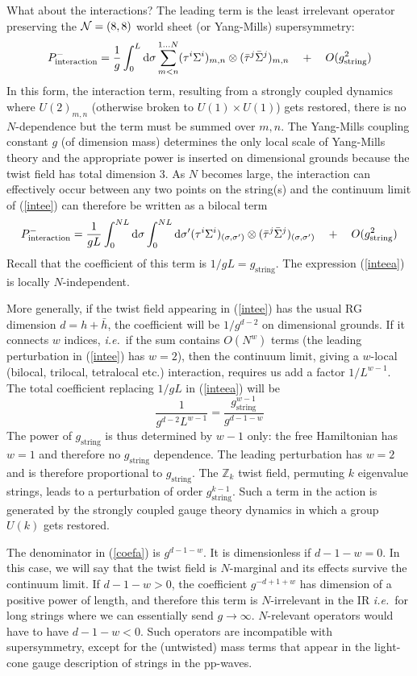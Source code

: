 \documentclass[nohyper,12pt,letterpaper]{JHEP3}
\def\IZ{{\mathbb Z}}           %
\def \eqref#1{(\ref{#1})}
\def \eqn#1#2{\begin{equation}#2\label{#1}\end{equation}}
\def \gs{g_{\mathrm{string}}}
\def \inte{{\mathrm{interaction}}}
\begin{document}
What about the interactions? The leading term is the least irrelevant
operator preserving the ${\cal N}=(8,8)$ world sheet (or Yang-Mills)
supersymmetry:
%
\eqn{intee}{P^-_\inte = 
\frac{1}{g}
\int_0^L {\rm d}\sigma
\sum_{m<n}^{1\dots N}
(\tau^i\Sigma^i)_{m,n}\otimes (\bar \tau^j\bar\Sigma^j)_{m,n}
\quad + \quad
O(\gs^2)} 
%
In this form, the interaction term, resulting from a
strongly coupled dynamics where $U(2)_{m,n}$ (otherwise broken to
$U(1)\times U(1)$) gets restored, there is no $N$-dependence but the
term must be summed over $m,n$. The Yang-Mills coupling constant $g$
(of dimension mass) determines the only local scale of Yang-Mills
theory and the appropriate power is inserted on dimensional grounds
because the twist field has total dimension $3$.  As $N$ becomes
large, the interaction can effectively occur between any two points on
the string(s) and the continuum limit of \eqref{intee} can therefore
be written as a bilocal term
%
\eqn{inteea}{P^-_\inte = \frac{1}{gL}
\int_0^{NL} {\rm d}\sigma
\int_0^{NL} {\rm d}\sigma'
(\tau^i\Sigma^i)_{(\sigma,\sigma')}\otimes (\bar \tau^j\bar\Sigma^j)_{
(\sigma,\sigma')}\quad + \quad
O(\gs^2)}
%
Recall that the coefficient of this term is $1/gL=\gs$. The expression 
\eqref{inteea} is locally $N$-independent.

More generally, if the twist field appearing in \eqref{intee} has 
the usual RG 
dimension $d=h+\bar h$, the coefficient will be $1/g^{d-2}$ on dimensional 
grounds. If it connects $w$ indices, {\it  i.e.}\ if the sum contains 
$O(N^w)$ terms (the leading perturbation in \eqref{intee} has $w=2$), then 
the continuum limit, giving a $w$-local (bilocal, trilocal, tetralocal 
etc.) interaction,
requires us add a factor $1/L^{w-1}$. The total 
coefficient replacing $1/gL$ in \eqref{inteea} will be
\eqn{coefa}{\frac{1}{g^{d-2}L^{w-1}}=\frac{\gs^{w-1}}{g^{d-1-w}}}
The power of $\gs$ is thus determined by $w-1$ only: the free Hamiltonian 
has $w=1$ and therefore no $\gs$ dependence. The leading perturbation has 
$w=2$ and is therefore proportional to $\gs$. The $\IZ_k$ twist field, 
permuting $k$ eigenvalue strings, leads to a perturbation of order 
$\gs^{k-1}$. Such a term in the action is generated by the strongly 
coupled gauge theory dynamics in which a group $U(k)$ gets restored.

The denominator in \eqref{coefa} is $g^{d-1-w}$. It is dimensionless
if $d-1-w=0$. In this case, we will say that the twist field is
$N$-marginal and its effects survive the continuum limit. If
$d-1-w>0$, the coefficient $g^{-d+1+w}$ has dimension of a positive
power of length, and therefore this term is $N$-irrelevant in the IR
{\it i.e.}\ for long strings where we can essentially send
$g\to\infty$. $N$-relevant operators would have to have
$d-1-w<0$. Such operators are incompatible with supersymmetry, except
for the (untwisted) mass terms that appear in the light-cone gauge
description of strings in the pp-waves.
\end{document}
